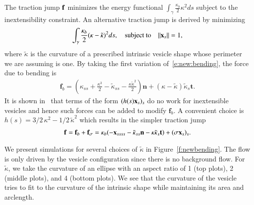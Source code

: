 The traction jump ${\mathbf{f}}$ minimizes the energy functional
$\int_{\gamma}\frac{\kappa_{b}}{2}\kappa^{2}ds$ subject to the
inextensibility constraint.  An alternative traction jump is derived by
minimizing
\begin{align}
  \int_{\gamma}\frac{\kappa_{b}}{2}(\kappa - \tilde{\kappa})^{2}ds, \quad \text{subject to} \quad \|{\mathbf{x}}_{s}\|=1,
    \label{e:new:bending}
\end{align}
where $\tilde{\kappa}$ is the curvature of a prescribed intrinsic
vesicle shape whose perimeter we are assuming is one.  By taking the
first variation of~\eqref{e:new:bending}, the force due to bending is
\begin{align*}
  \mathbf{f}_{b} = \left(\kappa_{ss} + \frac{\kappa^{3}}{2} -
    \tilde{\kappa}_{ss} - \frac{\kappa\tilde{\kappa}^{2}}{2}\right)\mathbf{n} + 
    (\kappa-\tilde{\kappa})\tilde{\kappa}_{s}\mathbf{t}.
\end{align*}
It is shown in~\cite{shravan} that terms of the form
$(h(s){\mathbf{x}}_{s})_{s}$ do no work for inextensible vesicles and hence
such forces can be added to modify $\mathbf{f}_{b}$.  A convenient
choice is $h(s) = 3/2\, \kappa^{2} - 1/2\, \tilde{\kappa}^{2}$ which
results in the simpler traction jump
\begin{align*}
  {\mathbf{f}} = {\mathbf{f}}_{b} + {\mathbf{f}}_{\sigma} = \kappa_{b}(-{\mathbf{x}}_{ssss} - \tilde{\kappa}_{ss} \mathbf{n} - 
    \kappa \tilde{\kappa}_{s}\mathbf{t}) + (\sigma {\mathbf{x}}_{s})_{s}.
\end{align*}

We present simulations for several choices of $\tilde{\kappa}$ in
Figure~\ref{f:newbending}.  The flow is only driven by the vesicle
configuration since there is no background flow.  For $\tilde{\kappa}$,
we take the curvature of an ellipse with an aspect ratio of 1 (top
plots), 2 (middle plots), and 4 (bottom plots).  We see that the
curvature of the vesicle tries to fit to the curvature of the intrinsic
shape while maintaining its area and arclength.


